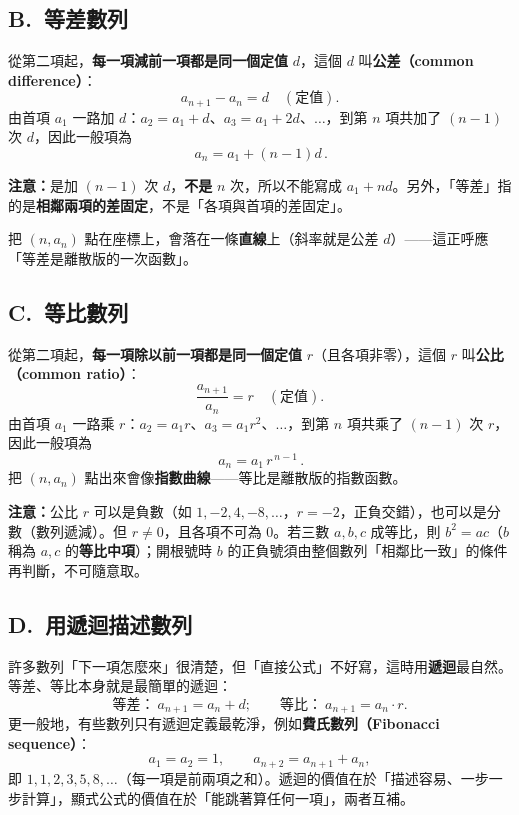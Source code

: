 \documentclass[11pt]{article}
\begin{document}
\subsection*{\sffamily B.\ 等差數列}

從第二項起，\textbf{每一項減前一項都是同一個定值} $d$，這個 $d$ 叫\textbf{公差（common difference）}：
$$a_{n+1}-a_n=d\quad(\text{定值}).$$
由首項 $a_1$ 一路加 $d$：$a_2=a_1+d$、$a_3=a_1+2d$、$\dots$，到第 $n$ 項共加了 $(n-1)$ 次 $d$，因此一般項為
$$\boxed{\,a_n=a_1+(n-1)d\,}.$$

\textbf{注意：}是加 $(n-1)$ 次 $d$，\textbf{不是} $n$ 次，所以不能寫成 $a_1+nd$。另外，「等差」指的是\textbf{相鄰兩項的差固定}，不是「各項與首項的差固定」。

把 $(n,a_n)$ 點在座標上，會落在一條\textbf{直線}上（斜率就是公差 $d$）——這正呼應「等差是離散版的一次函數」。

\subsection*{\sffamily C.\ 等比數列}

從第二項起，\textbf{每一項除以前一項都是同一個定值} $r$（且各項非零），這個 $r$ 叫\textbf{公比（common ratio）}：
$$\frac{a_{n+1}}{a_n}=r\quad(\text{定值}).$$
由首項 $a_1$ 一路乘 $r$：$a_2=a_1 r$、$a_3=a_1 r^2$、$\dots$，到第 $n$ 項共乘了 $(n-1)$ 次 $r$，因此一般項為
$$\boxed{\,a_n=a_1\,r^{\,n-1}\,}.$$
把 $(n,a_n)$ 點出來會像\textbf{指數曲線}——等比是離散版的指數函數。

\textbf{注意：}公比 $r$ 可以是負數（如 $1,-2,4,-8,\dots$，$r=-2$，正負交錯），也可以是分數（數列遞減）。但 $r\neq0$，且各項不可為 $0$。若三數 $a,b,c$ 成等比，則 $b^2=ac$（$b$ 稱為 $a,c$ 的\textbf{等比中項}）；開根號時 $b$ 的正負號須由整個數列「相鄰比一致」的條件再判斷，不可隨意取。


\subsection*{\sffamily D.\ 用遞迴描述數列}

許多數列「下一項怎麼來」很清楚，但「直接公式」不好寫，這時用\textbf{遞迴}最自然。等差、等比本身就是最簡單的遞迴：
$$
\text{等差：}\ a_{n+1}=a_n+d;\qquad \text{等比：}\ a_{n+1}=a_n\cdot r .
$$
更一般地，有些數列只有遞迴定義最乾淨，例如\textbf{費氏數列（Fibonacci sequence）}：
$$a_1=a_2=1,\qquad a_{n+2}=a_{n+1}+a_n,$$
即 $1,1,2,3,5,8,\dots$（每一項是前兩項之和）。遞迴的價值在於「描述容易、一步一步計算」，顯式公式的價值在於「能跳著算任何一項」，兩者互補。
\end{document}
